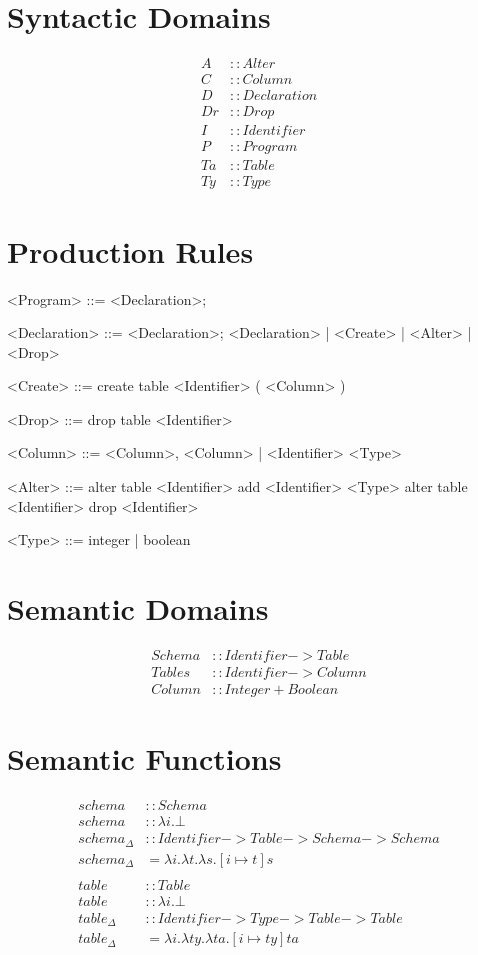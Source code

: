 \documentclass[12pt]{article}
\begin{document}
\section{Syntactic Domains}
\begin{align*}
  A &:: Alter \\
  C &:: Column \\
  D &:: Declaration \\
  Dr &:: Drop \\
  I &:: Identifier \\
  P &:: Program \\
  Ta &:: Table \\
  Ty &:: Type
\end{align*}

\section{Production Rules}
\begin{grammar}
  <Program> ::= <Declaration>;

  <Declaration> ::= <Declaration>; <Declaration> | <Create> | <Alter> | <Drop>

  <Create> ::= create table <Identifier> ( <Column> )

  <Drop> ::= drop table <Identifier>

  <Column> ::= <Column>, <Column> | <Identifier> <Type>

  <Alter> ::= alter table <Identifier> add <Identifier> <Type>
           \alt alter table <Identifier> drop <Identifier>

  <Type> ::= integer | boolean
\end{grammar}

\section{Semantic Domains}
\begin{align*}
  Schema &:: Identifier -> Table \\
  Tables &:: Identifier -> Column \\
  Column &:: Integer + Boolean
\end{align*}

\section{Semantic Functions}
\begin{align*}
  schema &:: Schema \\
  schema &:: \lambda i.\bot \\
  schema_{\Delta} &:: Identifier -> Table -> Schema -> Schema \\
  schema_{\Delta} &= \lambda i. \lambda t. \lambda s. [ i \mapsto t ]s \\
  \\
  table &:: Table \\
  table &:: \lambda i.\bot \\
  table_{\Delta} &:: Identifier -> Type -> Table -> Table \\
  table_{\Delta} &= \lambda i. \lambda ty. \lambda ta. [ i \mapsto ty ]ta
\end{align*}
\end{document}
